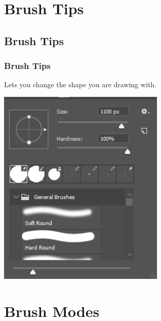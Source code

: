 \documentclass{beamer}
\begin{document}
\section{Brush Tips}	
\subsection{Brush Tips}	
\begin{frame}
	\frametitle{Brush Tips}
	\begin{outline}
		\1 Lets you change the shape you are drawing with.
	\end{outline}
	\begin{center}
		\includegraphics[width = 0.6\textwidth]{images/brush tips.png}
	\end{center}
\end{frame}

\section{Brush Modes}	
\end{document}
